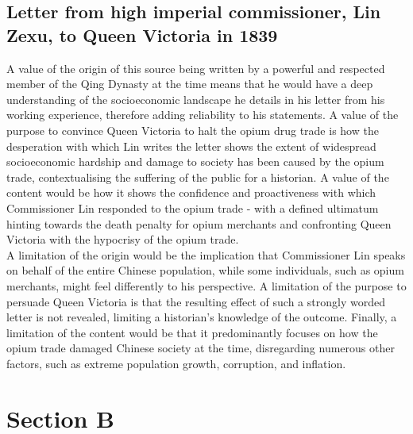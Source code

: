 \subsection{Letter from high imperial commissioner, Lin Zexu, to Queen Victoria in 1839}

A value of the origin of this source being written by a powerful and respected member of the Qing Dynasty at the time means that he would have a deep understanding of the socioeconomic landscape he details in his letter from his working experience, therefore adding reliability to his statements. A value of the purpose to convince Queen Victoria to halt the opium drug trade is how the desperation with which Lin writes the letter shows the extent of widespread socioeconomic hardship and damage to society has been caused by the opium trade, contextualising the suffering of the public for a historian. A value of the content would be how it shows the confidence and proactiveness with which Commissioner Lin responded to the opium trade - with a defined ultimatum hinting towards the death penalty for opium merchants and confronting Queen Victoria with the hypocrisy of the opium trade. \\

A limitation of the origin would be the implication that Commissioner Lin speaks on behalf of the entire Chinese population, while some individuals, such as opium merchants, might feel differently to his perspective. A limitation of the purpose to persuade Queen Victoria is that the resulting effect of such a strongly worded letter is not revealed, limiting a historian’s knowledge of the outcome. Finally, a limitation of the content would be that it predominantly focuses on how the opium trade damaged Chinese society at the time, disregarding numerous other factors, such as extreme population growth, corruption, and inflation.

\section{Section B}

